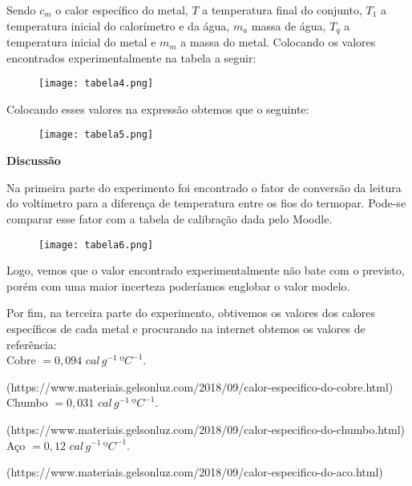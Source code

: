 \documentclass[a4paper, 12pt]{article}
\begin{document}
Sendo $c_m$ o calor específico do metal, $T$ a temperatura final do conjunto, $T_1$ a temperatura inicial do calorímetro e da água, $m_a$ massa de água, $T_q$ a temperatura inicial do metal e $m_m$ a massa do metal.
Colocando os valores encontrados experimentalmente na tabela a seguir:

\begin{figure}[!h]
		\centering
		\texttt{[image: tabela4.png]}
		\end{figure}
Colocando esses valores na expressão obtemos que o seguinte:

\begin{figure}[!h]
		\centering
		\texttt{[image: tabela5.png]}
		\end{figure}

\pagebreak


\textbf{Discussão}

Na primeira parte do experimento foi encontrado o fator de conversão da leitura do voltímetro para a diferença de temperatura entre os fios do termopar. Pode-se comparar esse fator com a tabela de calibração dada pelo Moodle.

\begin{figure}[!h]
		\centering
		\texttt{[image: tabela6.png]}
		\end{figure}


Logo, vemos que o valor encontrado experimentalmente não bate com o previsto, porém com uma maior incerteza poderíamos englobar o valor modelo.

Por fim, na terceira parte do experimento, obtivemos os valores dos calores específicos de cada metal e procurando na internet obtemos os valores de referência: 
\\

Cobre $= 0,094 \, \, cal \, g^{-1} \, ºC^{-1}$.

(https://www.materiais.gelsonluz.com/2018/09/calor-especifico-do-cobre.html)
\\


Chumbo $= 0,031 \, \, cal \, g^{-1} \, ºC^{-1}$.

(https://www.materiais.gelsonluz.com/2018/09/calor-especifico-do-chumbo.html) 
\\

Aço $= 0,12 \, \, cal \, g^{-1} \, ºC^{-1}$.

(https://www.materiais.gelsonluz.com/2018/09/calor-especifico-do-aco.html)
\\
\\
\end{document}
